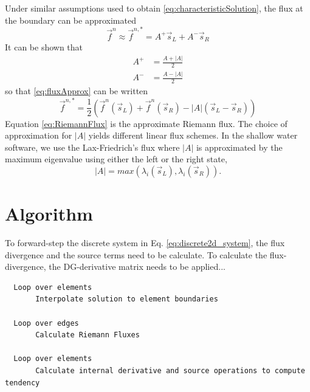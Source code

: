\documentclass{softwaremanual}
\begin{document}
Under similar assumptions used to obtain \eqref{eq:characteristicSolution}, the flux at the boundary can be approximated
\begin{equation}
\vec{f}^n \approx \vec{f}^{n,*} = A^{+}\vec{s}_L + A^{-}\vec{s}_R  \label{eq:fluxApprox}
\end{equation}
It can be shown that
\begin{subequations}
\begin{align}
A^{+} &= \frac{A+|A|}{2} \\
A^{-} &= \frac{A-|A|}{2}
\end{align}
\end{subequations}
so that \eqref{eq:fluxApprox} can be written
\begin{equation}
\vec{f}^{n,*} = \frac{1}{2}\left( \vec{f}^n(\vec{s}_L) + \vec{f}^n(\vec{s}_R) -|A|(\vec{s}_L - \vec{s}_R) \right)\label{eq:RiemannFlux}
\end{equation}
Equation \eqref{eq:RiemannFlux} is the approximate Riemann flux. The choice of approximation for $|A|$ yields different linear flux schemes. In the shallow water software, we use the Lax-Friedrich's flux where $|A|$ is approximated by the maximum eigenvalue using either the left or the right state,
\begin{equation}
|A| = max( \lambda_i(\vec{s}_L), \lambda_i(\vec{s}_R) ).
\end{equation}

\section{Algorithm}

To forward-step the discrete system in Eq. \eqref{eq:discrete2d_system}, the flux divergence and the source terms need to be calculate. To calculate the flux-divergence, the DG-derivative matrix needs to be applied...
\begin{verbatim}
  Loop over elements
       Interpolate solution to element boundaries
       
  Loop over edges
       Calculate Riemann Fluxes
       
  Loop over elements
       Calculate internal derivative and source operations to compute tendency
\end{verbatim}
\end{document}
